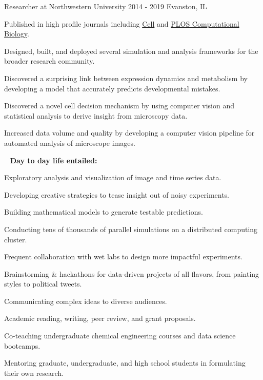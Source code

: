 \begin{cventries}
  \cventrynew
	{Researcher at Northwestern University}    
    {2014 - 2019} 
    {Evanston, IL} 
    { \begin{cvitems}	
		\item {Published in high profile journals including \href{https://doi.org/10.1016/j.cell.2019.06.023}{Cell} and \href{https://doi.org/10.1371/journal.pcbi.1007406}{PLOS Computational Biology}.}
		\item {Designed, built, and deployed several simulation and analysis frameworks for the broader research community.}
		\item {Discovered a surprising link between expression dynamics and metabolism by developing a model that accurately predicts developmental mistakes.}
		\item {Discovered a novel cell decision mechanism by using computer vision and statistical analysis to derive insight from microscopy data.}
		\item {Increased data volume and quality by developing a computer vision pipeline for automated analysis of microscope images.}		
	  \end{cvitems}
     \vspace{6.0mm}
    \ \newline 
    \textbf{Day to day life entailed:}
    \vspace{4.0mm}
     \begin{cvitems}
     	\item {Exploratory analysis and visualization of image and time series data.}     	
     	\item {Developing creative strategies to tease insight out of noisy experiments.}   	
     	\item {Building mathematical models to generate testable predictions.}
		\item {Conducting tens of thousands of parallel simulations on a distributed computing cluster.}
		\item {Frequent collaboration with wet labs to design more impactful experiments.}		 
		\item {Brainstorming \& hackathons for data-driven projects of all flavors, from painting styles to political tweets.}
		\item {Communicating complex ideas to diverse audiences.}
		\item {Academic reading, writing, peer review, and grant proposals.}
        \item {Co-teaching undergraduate chemical engineering courses and data science bootcamps.}
        \item {Mentoring graduate, undergraduate, and high school students in formulating their own research.}         
      \end{cvitems}
     }
     


\end{cventries}
